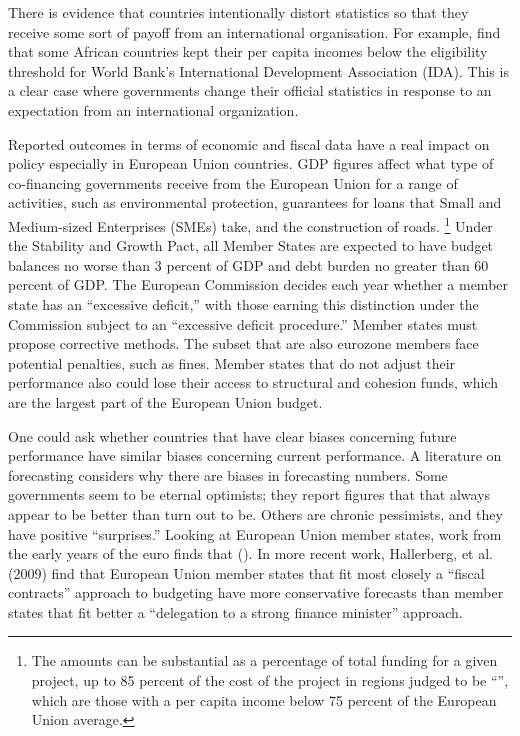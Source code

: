 \documentclass[]{article}
\begin{document}
There is evidence that countries intentionally distort statistics so that they receive some sort of payoff from an international organisation. For example, \cite{Kerneretal2014} find that some African countries kept their per capita incomes below the  eligibility threshold for World
Bank’s International Development Association (IDA).  This is a clear case where governments change their official statistics in response to an expectation from an international organization.

Reported outcomes in terms of economic and fiscal data have a real impact on policy especially in European Union countries. GDP figures affect what type of co-financing governments receive from the European Union for a range of activities, such as environmental protection, guarantees for loans that Small and Medium-sized Enterprises (SMEs) take, and the construction of roads. \footnote{The amounts can be substantial as a percentage of total funding for a given project, up to 85 percent of the cost of the project in regions judged to be “”, which are those with a per capita income below 75 percent of the European Union average.} Under the Stability and Growth Pact, all Member States are expected to have budget balances no worse than 3 percent of GDP and debt burden no greater than 60 percent of GDP. The European Commission decides each year whether a member state has an “excessive deficit,” with those earning this distinction under the Commission subject to an “excessive deficit procedure.” Member states must propose corrective methods. The subset that are also eurozone members face potential penalties, such as fines. Member states that do not adjust their performance also could lose their access to structural and cohesion funds, which are the largest part of the European Union budget.

One could ask whether countries that have clear biases concerning future performance have similar biases concerning current performance. A literature on forecasting considers why there are biases in forecasting numbers. Some governments seem to be eternal optimists; they report figures that that always appear to be better than turn out to be. Others are chronic pessimists, and they have positive “surprises.” Looking at European Union member states, work from the early years of the euro finds that (\cite{HallerbergStrauch2002}). In more recent work, Hallerberg, et al. (2009) find that European Union member states that fit most closely a “fiscal contracts” approach to budgeting have more conservative forecasts than member states that fit better a “delegation to a strong finance minister” approach.
\end{document}

